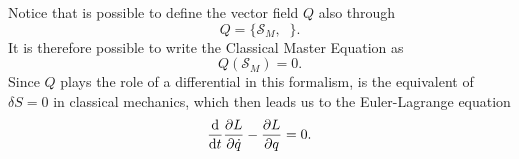 Notice that is possible to define the vector field $Q$ also through
\begin{equation*}
    Q = \{\mathcal{S}_M, \;\; \}.
\end{equation*}
It is therefore possible to write the Classical Master Equation as
\begin{equation}
\label{eq:QS0}
    Q(\mathcal{S}_M) = 0 .
\end{equation}
Since $Q$ plays the role of a differential in this formalism,  is the equivalent of $\delta S = 0$ in classical mechanics, which then leads us to the Euler-Lagrange equation
\begin{equation}
    \dv{t} \pdv{L}{\dot{q}} - \pdv{L}{q} = 0 .
\end{equation}